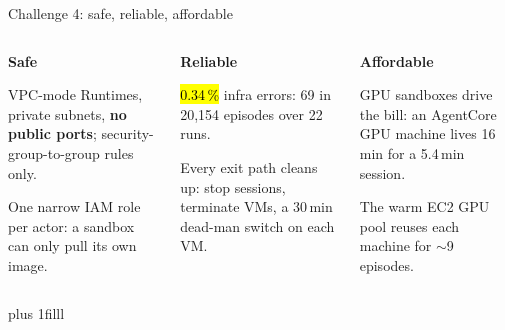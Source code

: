 \begin{frame}{Challenge 4: safe, reliable, affordable}
\begin{columns}[T]
\colorbox{panel}{\parbox[t][42mm]{\dimexpr\linewidth-2\fboxsep}{\raggedright\vspace{1.5mm}
{\large\bfseries\textcolor{awsteal}{Safe}}\par\vspace{1.5mm}\normalsize
VPC-mode Runtimes, private subnets, \textbf{no public ports}; security-group-to-group rules only.\par\vspace{1.5mm}
One narrow IAM role per actor: a sandbox can only pull its own image.}}
\colorbox{panel}{\parbox[t][42mm]{\dimexpr\linewidth-2\fboxsep}{\raggedright\vspace{1.5mm}
{\large\bfseries\textcolor{awsteal}{Reliable}}\par\vspace{1.5mm}\normalsize
\hl{0.34\,\%} infra errors: 69 in 20{,}154 episodes over 22 runs.\par\vspace{1.5mm}
Every exit path cleans up: stop sessions, terminate VMs, a 30\,min dead-man switch on each VM.}}
\colorbox{panel}{\parbox[t][42mm]{\dimexpr\linewidth-2\fboxsep}{\raggedright\vspace{1.5mm}
{\large\bfseries\textcolor{awsteal}{Affordable}}\par\vspace{1.5mm}\normalsize
GPU sandboxes drive the bill: an AgentCore GPU machine lives 16\,min for a 5.4\,min session.\par\vspace{1.5mm}
The warm EC2 GPU pool reuses each machine for $\sim$9 episodes.}}
\end{columns}
\par\vskip 0pt plus 1filll
\end{frame}

